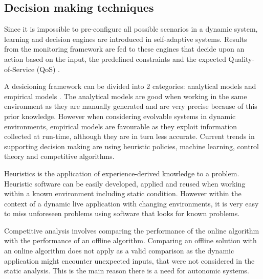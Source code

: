 \subsection{Decision making techniques}
\label{sec:decisions}
%
Since it is impossible to pre-configure all possible scenarios in a dynamic system, learning and decision engines are introduced in self-adaptive systems. Results from the monitoring framework are fed to these engines that decide upon an action based on the input, the predefined constraints and the expected Quality-of-Service (QoS) \cite{evolvable}. 

A desicioning framework can be divided into 2 categories: analytical models and empirical models \cite{evolvable}. The analytical models are good when working in the same environment as they are manually generated and are very precise because of this prior knowledge. However when considering evolvable systems in dynamic environments, empirical models are favourable as they exploit information collected at run-time, although they are in turn less accurate. Current trends in supporting decision making are using heuristic policies, machine learning, control theory and competitive algorithms. 

Heuristics is the application of experience-derived knowledge to a problem. Heuristic software can be easily developed, applied and reused when working within a known environment including static condition. However within the context of a dynamic live application with changing environments, it is very easy to miss unforeseen problems using software that looks for known problems. %

Competitive analysis involves comparing the performance of the online algorithm with the performance of an offline algorithm. Comparing an offline solution with an online algorithm does not apply as a valid comparison as the dynamic application might encounter unexpected inputs, that were not considered in the static analysis. This is the main reason there is a need for autonomic systems. 
%
